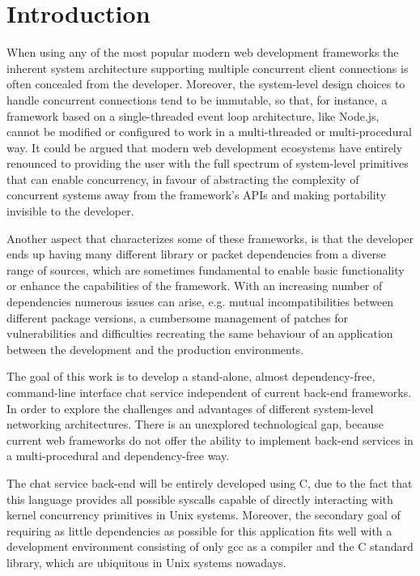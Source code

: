 \section{Introduction}
When using any of the most popular modern web development frameworks the inherent system architecture supporting multiple concurrent client connections is often concealed from the developer. Moreover, the system-level design choices to handle concurrent connections tend to be immutable, so that, for instance, a framework based on a single-threaded event loop architecture, like Node.js, cannot be modified or configured to work in a multi-threaded or multi-procedural way. It could be argued that modern web development ecosystems have entirely renounced to providing the user with the full spectrum of system-level primitives that can enable concurrency, in favour of abstracting the complexity of concurrent systems away from the framework's APIs and making portability invisible to the developer.

Another aspect that characterizes some of these frameworks, is that the developer ends up having many different library or packet dependencies from a diverse range of sources, which are sometimes fundamental to enable basic functionality or enhance the capabilities of the framework. With an increasing number of dependencies numerous issues can arise, e.g. mutual incompatibilities between different package versions, a cumbersome management of patches for vulnerabilities and difficulties recreating the same behaviour of an application between the development and the production environments. 

The goal of this work is to develop a stand-alone, almost dependency-free, command-line interface chat service independent of current back-end frameworks. In order to explore the challenges and advantages of different system-level networking architectures. There is an unexplored technological gap, because current web frameworks do not offer the ability to implement back-end services in a multi-procedural and dependency-free way. 

The chat service back-end will be entirely developed using C, due to the fact that this language provides all possible syscalls capable of directly interacting with kernel concurrency primitives in Unix systems. Moreover, the secondary goal of requiring as little dependencies as possible for this application fits well with a development environment consisting of only gcc as a compiler and the C standard library, which are ubiquitous in Unix systems nowadays. 

